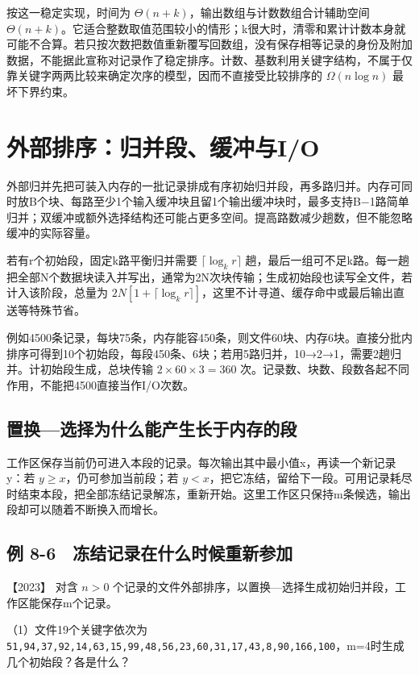按这一稳定实现，时间为 \(\Theta(n+k)\)，输出数组与计数数组合计辅助空间 \(\Theta(n+k)\)。它适合整数取值范围较小的情形；k很大时，清零和累计计数本身就可能不合算。若只按次数把数值重新覆写回数组，没有保存相等记录的身份及附加数据，不能据此宣称对记录作了稳定排序。计数、基数利用关键字结构，不属于仅靠关键字两两比较来确定次序的模型，因而不直接受比较排序的 \(\Omega(n\log n)\) 最坏下界约束。

\section{外部排序：归并段、缓冲与I/O}\label{ds-08-10}

外部归并先把可装入内存的一批记录排成有序初始归并段，再多路归并。内存可同时放B个块、每路至少1个输入缓冲块且留1个输出缓冲块时，最多支持B−1路简单归并；双缓冲或额外选择结构还可能占更多空间。提高路数减少趟数，但不能忽略缓冲的实际容量。

若有r个初始段，固定k路平衡归并需要 \(\lceil\log_k r\rceil\) 趟，最后一组可不足k路。每一趟把全部N个数据块读入并写出，通常为2N次块传输；生成初始段也读写全文件，若计入该阶段，总量为 \(2N[1+\lceil\log_k r\rceil]\)，这里不计寻道、缓存命中或最后输出直送等特殊节省。

例如4500条记录，每块75条，内存能容450条，则文件60块、内存6块。直接分批内排序可得到10个初始段，每段450条、6块；若用5路归并，10→2→1，需要2趟归并。计初始段生成，总块传输 \(2\times60\times3=360\) 次。记录数、块数、段数各起不同作用，不能把4500直接当作I/O次数。

\subsection{置换---选择为什么能产生长于内存的段}\label{ds-c08-h189}

工作区保存当前仍可进入本段的记录。每次输出其中最小值x，再读一个新记录y：若 \(y\ge x\)，仍可参加当前段；若 \(y<x\)，把它冻结，留给下一段。可用记录耗尽时结束本段，把全部冻结记录解冻，重新开始。这里工作区只保持m条候选，输出段却可以随着不断换入而增长。

\subsection{例 8-6　冻结记录在什么时候重新参加}\label{ds-ex8-6}

\noindent{}【2023】 对含 \(n>0\) 个记录的文件外部排序，以置换---选择生成初始归并段，工作区能保存m个记录。

（1）文件19个关键字依次为 \allowbreak{}\texttt{51,}\allowbreak{}\texttt{94,}\allowbreak{}\texttt{37,}\allowbreak{}\texttt{92,}\allowbreak{}\texttt{14,}\allowbreak{}\texttt{63,}\allowbreak{}\texttt{15,}\allowbreak{}\texttt{99,}\allowbreak{}\texttt{48,}\allowbreak{}\texttt{56,}\allowbreak{}\texttt{23,}\allowbreak{}\texttt{60,}\allowbreak{}\texttt{31,}\allowbreak{}\texttt{17,}\allowbreak{}\texttt{43,}\allowbreak{}\texttt{8,}\allowbreak{}\texttt{90,}\allowbreak{}\texttt{166,}\allowbreak{}\texttt{100}，m=4时生成几个初始段？各是什么？


